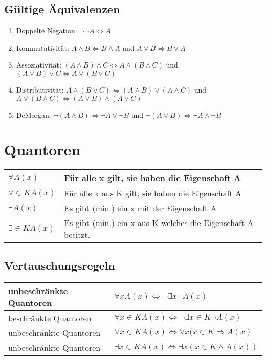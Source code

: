 \subsection{Gültige Äquivalenzen}
\begin{enumerate}
	\item Doppelte Negation: $\neg\neg A \Leftrightarrow A$
	\item Kommutativität: $A \wedge B \Leftrightarrow B \wedge A$ und $A \vee B \Leftrightarrow B \vee A$
	\item Assoziativität: $(A \wedge B) \wedge C \Leftrightarrow A \wedge (B \wedge C)$ und $(A \vee B) \vee C \Leftrightarrow A \vee (B \vee C)$
	\item Distributivität: $A \wedge (B \vee C) \Leftrightarrow (A \wedge B) \vee (A \wedge C)$ und $A \vee (B \wedge C) \Leftrightarrow (A \vee B) \wedge (A \vee C)$
	\item DeMorgan: \( \neg (A \wedge B) \Leftrightarrow \neg A \vee \neg B\) und \(\neg (A \vee B) \Leftrightarrow \neg A \wedge \neg B \)
	\end{enumerate}


\section{Quantoren}
\begin{longtable}{|p{}|p{}|}
	\hline
	\( \forall A(x) \) & Für alle x gilt, sie haben die Eigenschaft A \\
	\hline
	\( \forall \in K A(x) \) & Für alle x aus K gilt, sie haben die Eigenschaft A \\
	\hline
	\( \exists A(x) \) & Es gibt (min.) ein x mit der Eigenschaft A \\
	\hline
	\( \exists \in K A(x) \) & Es gibt (min.) ein x aus K welches die Eigenschaft A besitzt. \\
	\hline
\end{longtable}

\subsection{Vertauschungsregeln}
\begin{longtable}{|p{}|p{}|}
	\hline
	unbeschränkte Quantoren & \( \forall x A(x) \Leftrightarrow \neg \exists x \neg A(x) \)\\
	\hline
	beschränkte Quantoren & \( \forall x \in K A(x) \Leftrightarrow \neg \exists x \in K \neg A(x) \)\\
	\hline
	unbeschränkte Quantoren & \( \forall x \in K A(x) \Leftrightarrow \forall x (x \in K \Rightarrow A(x) \)\\
	\hline
	unbeschränkte Quantoren & \( \exists x \in K A(x) \Leftrightarrow \exists x (x \in K \wedge A(x)) \)\\
	\hline
\end{longtable}
